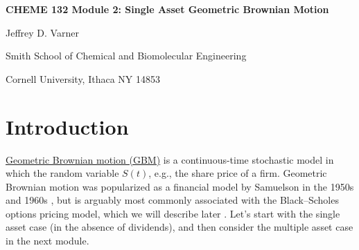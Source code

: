 \documentclass[11pt]{article}
\theoremstyle{definition}
\begin{document}
{\par\centering\textbf{\Large CHEME 132 Module 2: Single Asset Geometric Brownian Motion}}
\vspace{0.2in}
{\par \centering \large{Jeffrey D. Varner}}
\vspace{0.05in}
{\par \centering \large{Smith School of Chemical and Biomolecular Engineering}}
{\par \centering \large{Cornell University, Ithaca NY 14853}}

\date{}
\thispagestyle{empty}

\setcounter{page}{1}

\section*{Introduction}
\href{https://en.wikipedia.org/wiki/Geometric_Brownian_motion}{Geometric Brownian motion (GBM)} is a continuous-time stochastic model in which the random variable $S(t)$, 
e.g., the share price of a firm. 
Geometric Brownian motion was popularized as a financial model by Samuelson in the 1950s and 1960s \cite{Merton2006}, 
but is arguably most commonly associated with the Black–Scholes options pricing model, which we will describe later 
\cite{BlackScholes1973}. Let's start with the single asset case (in the absence of dividends), 
and then consider the multiple asset case in the next module.
\end{document}
